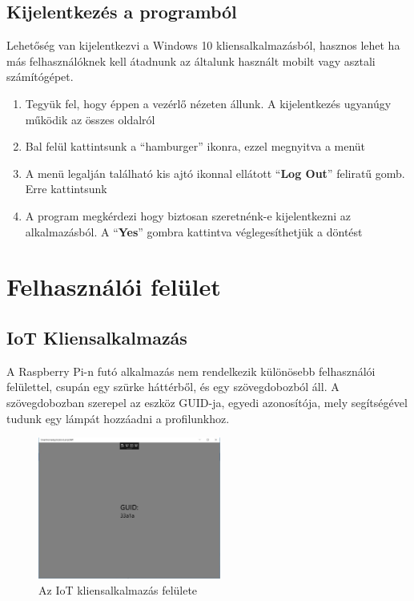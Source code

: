 \documentclass[a4paper,12pt]{report}
\begin{document}
\subsection{Kijelentkezés a programból}
    Lehetőség van kijelentkezvi a Windows 10 kliensalkalmazásból, hasznos lehet ha más felhasználóknek kell átadnunk az általunk
    használt mobilt vagy asztali számítógépet.

\begin{enumerate}
    \item Tegyük fel, hogy éppen a vezérlő nézeten állunk. A kijelentkezés ugyanúgy működik az összes oldalról
    \item Bal felül kattintsunk a ``hamburger'' ikonra, ezzel megnyitva a menüt
    \item A menü legalján található kis ajtó ikonnal ellátott ``\textbf{Log Out}'' feliratű gomb. Erre kattintsunk
    \item A program megkérdezi hogy biztosan szeretnénk-e kijelentkezni az alkalmazásból. A ``\textbf{Yes}'' gombra kattintva
    véglegesíthetjük a döntést
\end{enumerate}

\section{Felhasználói felület}

\subsection{IoT Kliensalkalmazás}
    A Raspberry Pi-n futó alkalmazás nem rendelkezik különösebb felhasználói felülettel, csupán egy szürke háttérből, és egy
    szövegdobozból áll. A szövegdobozban szerepel az eszköz GUID-ja, egyedi azonosítója, mely segítségével tudunk egy lámpát
    hozzáadni a profilunkhoz.

\begin{figure}[h!]
    \centering
    \includegraphics[width=6cm]{images/lampuwp.jpg}
    \caption{Az IoT kliensalkalmazás felülete}
    \label{fig: LampUWP}
\end{figure}
\end{document}
